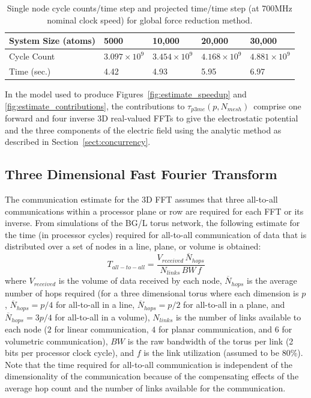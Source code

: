 \documentclass[doublespacing]{elsart}
\newcommand{\nodecount}{\ensuremath{p}}
\newcommand{\meshsize}[1]{\ensuremath{N_{#1}}}
\newcommand{\pmetime}{\ensuremath{\tau_{p3me}(\nodecount,\meshsize{mesh})}}
\begin{document}
\begin{table}
\begin{tabular}{|l|l|l|l|l|}\hline
System Size (atoms)& 5000& 10,000& 20,000& 30,000 \\ \hline
Cycle Count& $3.097\times 10^9$& $3.454\times 10^9$& $4.168\times 10^9$& $4.881\times 10^9$\\ \hline
Time (sec.)& 4.42& 4.93& 5.95& 6.97\\ \hline
\end{tabular}
\caption{Single node cycle counts/time step and projected time/time
  step (at 700MHz nominal clock speed) for global force reduction
  method.}
\label{tab:gfr_uniproc}
\end{table}

In the model used to produce
Figures~\ref{fig:estimate_speedup} and
\ref{fig:estimate_contributions}, the contributions to \pmetime\
comprise one forward and four inverse 3D real-valued FFTs to give the
electrostatic potential and the three components of the electric field
using the analytic method as described in
Section~\ref{sect:concurrency}.

\subsection{Three Dimensional Fast Fourier Transform}

The communication estimate for the 3D FFT assumes that three
all-to-all communications within a processor plane or row are required
for each FFT or its inverse.  From simulations of the BG/L torus
network, the following estimate for the time (in processor cycles)
required for all-to-all communication of data that is distributed over
a set of nodes in a line, plane, or volume is
obtained\cite{bgl_comm:2002}:
\begin{displaymath}
T_{all-to-all} = \frac{V_{received}\,\overline{N}_{hops}}{N_{links}\,BW\,f}
\end{displaymath}
where $V_{received}$ is the volume of data received by each node,
$\overline{N}_{hops}$ is the average number of hops required (for a
three dimensional torus where each dimension is $p$,
$\overline{N}_{hops} = p/4$ for all-to-all in a line,
$\overline{N}_{hops} = p/2$ for all-to-all in a plane, and
$\overline{N}_{hops} = 3p/4$ for all-to-all in a volume), $N_{links}$ is
the number of links available to each node ($2$ for linear
communication, $4$ for planar communication, and $6$ for volumetric
communication), $BW$ is the raw bandwidth of the torus per link (2
bits per processor clock cycle), and $f$ is the link utilization
(assumed to be 80\%).  Note that the time required for all-to-all
communication is independent of the dimensionality of the
communication because of the compensating effects of the average hop
count and the number of links available for the communication.
\end{document}
